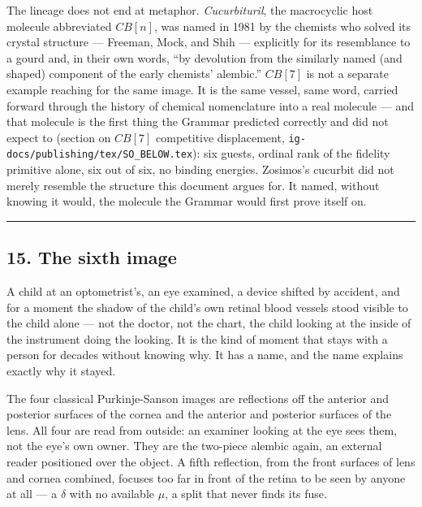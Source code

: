 The lineage does not end at metaphor. \emph{Cucurbituril}, the
macrocyclic host molecule abbreviated \({CB[n]}\), was named in 1981 by
the chemists who solved its crystal structure --- Freeman, Mock, and
Shih --- explicitly for its resemblance to a gourd and, in their own
words, ``by devolution from the similarly named (and shaped) component
of the early chemists' alembic.'' \({CB[7]}\) is not a separate example
reaching for the same image. It is the same vessel, same word, carried
forward through the history of chemical nomenclature into a real
molecule --- and that molecule is the first thing the Grammar predicted
correctly and did not expect to (section on \({CB[7]}\) competitive
displacement, \texttt{ig-docs/publishing/tex/SO\_BELOW.tex}): six
guests, ordinal rank of the fidelity primitive alone, six out of six, no
binding energies. Zosimos's cucurbit did not merely resemble the
structure this document argues for. It named, without knowing it would,
the molecule the Grammar would first prove itself on.

\begin{center}\rule{0.5\linewidth}{0.5pt}\end{center}

\hypertarget{the-sixth-image}{%
\subsection{15. The sixth image}\label{the-sixth-image}}

A child at an optometrist's, an eye examined, a device shifted by
accident, and for a moment the shadow of the child's own retinal blood
vessels stood visible to the child alone --- not the doctor, not the
chart, the child looking at the inside of the instrument doing the
looking. It is the kind of moment that stays with a person for decades
without knowing why. It has a name, and the name explains exactly why it
stayed.

The four classical Purkinje-Sanson images are reflections off the
anterior and posterior surfaces of the cornea and the anterior and
posterior surfaces of the lens. All four are read from outside: an
examiner looking at the eye sees them, not the eye's own owner. They are
the two-piece alembic again, an external reader positioned over the
object. A fifth reflection, from the front surfaces of lens and cornea
combined, focuses too far in front of the retina to be seen by anyone at
all --- a \({δ}\) with no available \({μ}\), a split that never finds
its fuse.

